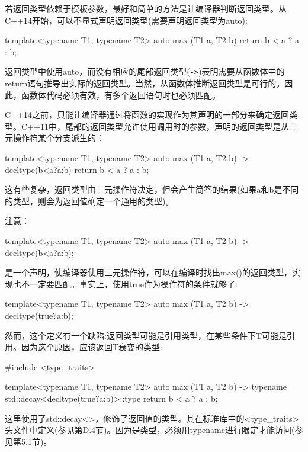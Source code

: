 若返回类型依赖于模板参数，最好和简单的方法是让编译器判断返回类型。从C++14开始，可以不显式声明返回类型(需要声明返回类型为auto):

\begin{cpp}
template<typename T1, typename T2>
auto max (T1 a, T2 b)
{
	return b < a ? a : b;
}
\end{cpp}

返回类型中使用auto，而没有相应的尾部返回类型(\texttt{->})表明需要从函数体中的return语句推导出实际的返回类型。当然，从函数体推断返回类型是可行的。因此，函数体代码必须有效，有多个返回语句时也必须匹配。

C++14之前，只能让编译器通过将函数的实现作为其声明的一部分来确定返回类型。C++11中，尾部的返回类型允许使用调用时的参数，声明的返回类型是从三元操作符某个分支派生的：

\begin{cpp}
template<typename T1, typename T2>
auto max (T1 a, T2 b) -> decltype(b<a?a:b)
{
	return b < a ? a : b;
}
\end{cpp}

这有些复杂，返回类型由三元操作符决定，但会产生简答的结果(如果a和b是不同的类型，则会为返回值确定一个通用的类型)。

注意：

\begin{cpp}
template<typename T1, typename T2>
auto max (T1 a, T2 b) -> decltype(b<a?a:b);
\end{cpp}

是一个声明，使编译器使用三元操作符，可以在编译时找出max()的返回类型，实现也不一定要匹配。事实上，使用true作为操作符的条件就够了:

\begin{cpp}
template<typename T1, typename T2>
auto max (T1 a, T2 b) -> decltype(true?a:b);
\end{cpp}

然而，这个定义有一个缺陷:返回类型可能是引用类型，在某些条件下T可能是引用。因为这个原因，应该返回T衰变的类型:

\begin{cpp}
#include <type_traits>

template<typename T1, typename T2>
auto max (T1 a, T2 b) -> typename std::decay<decltype(true?a:b)>::type
{
	return b < a ? a : b;
}
\end{cpp}

这里使用了std::decay<>，修饰了返回值的类型。其在标准库中的<type\_traits>头文件中定义(参见第D.4节)。因为是类型，必须用typename进行限定才能访问(参见第5.1节)。

